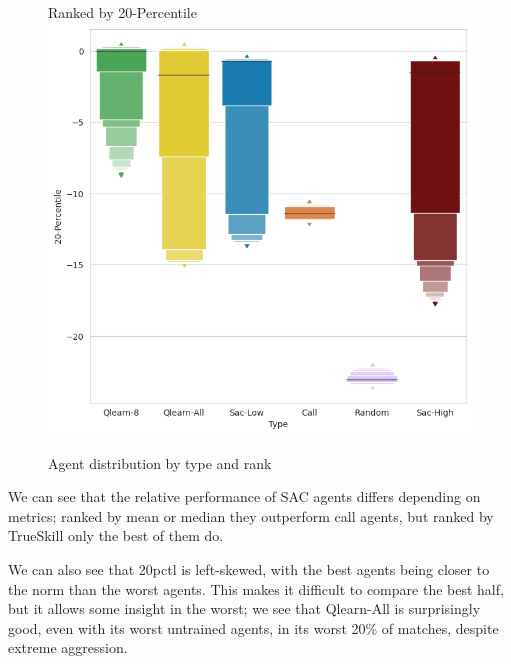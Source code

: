 \begin{figure}[H]
{    Ranked by 20-Percentile
}{
    \includegraphics[width=0.45\linewidth]{Results/figures/agentdist20-Percentile.png}
}
\caption{Agent distribution by type and rank}
\label{AgentTypeDistribution}
\end{figure}

We can see that the relative performance of SAC agents differs depending on metrics; ranked by mean or median they outperform call agents, but ranked by TrueSkill only the best of them do.

We can also see that 20pctl is left-skewed, with the best agents being closer to the norm than the worst agents. This makes it difficult to compare the best half, but it allows some insight in the worst; we see that Qlearn-All is surprisingly good, even with its worst untrained agents, in its worst 20\% of matches, despite extreme aggression.

